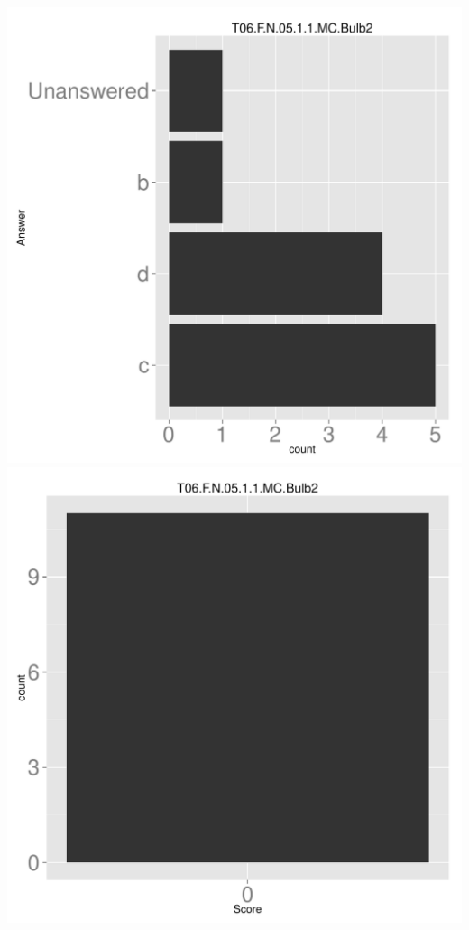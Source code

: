 \documentclass[12pt,english,nohyper]{tufte-handout}\usepackage[]{graphicx}\usepackage[]{color}
\begin{document}
\begin{center} \includegraphics[width=.45\linewidth]{Topic06_AB_51_answer} \includegraphics[width=.45\linewidth]{Topic06_AB_51_score} \end{center} 
\end{document}
